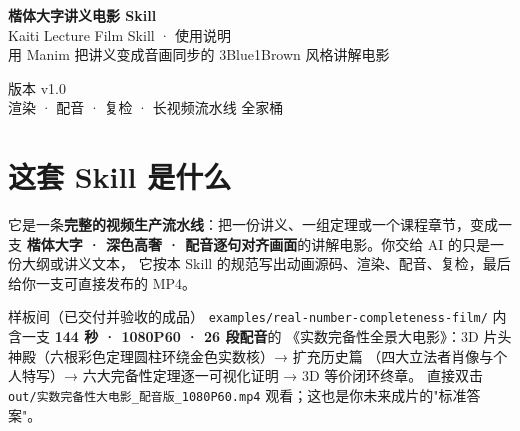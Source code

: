 \documentclass[12pt,a4paper]{ctexart}
\newcommand{\code}[1]{\texttt{\small #1}}
\begin{document}
\begin{titlepage}
    \centering\vspace*{2.2cm}
    {\Huge\bfseries\color{ptblue} 楷体大字讲义电影 Skill}\\[0.55cm]
    {\Large\color{ptteal} Kaiti Lecture Film Skill · 使用说明}\\[0.35cm]
    {\color{gray} 用 Manim 把讲义变成音画同步的 3Blue1Brown 风格讲解电影}\\[1.1cm]


    \vfill
    {\large 版本 v1.0}\\[0.3cm]
    {\small\color{gray} 渲染 · 配音 · 复检 · 长视频流水线 全家桶}
\end{titlepage}

\tableofcontents
\newpage

\section{这套 Skill 是什么}

它是一条\textbf{完整的视频生产流水线}：把一份讲义、一组定理或一个课程章节，变成一支
\textbf{楷体大字 · 深色高奢 · 配音逐句对齐画面}的讲解电影。你交给 AI 的只是一份大纲或讲义文本，
它按本 Skill 的规范写出动画源码、渲染、配音、复检，最后给你一支可直接发布的 MP4。

\begin{infobox}{样板间（已交付并验收的成品）}
\code{examples/real-number-completeness-film/} 内含一支 \textbf{144 秒 · 1080P60 · 26 段配音}的
《实数完备性全景大电影》：3D 片头神殿（六根彩色定理圆柱环绕金色实数核）→ 扩充历史篇
（四大立法者肖像与个人特写）→ 六大完备性定理逐一可视化证明 → 3D 等价闭环终章。
直接双击 \code{out/实数完备性大电影\_配音版\_1080P60.mp4} 观看；这也是你未来成片的"标准答案"。
\end{infobox}
\end{document}
